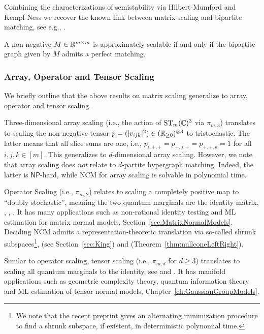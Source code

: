 Combining the characterizations of semistability via Hilbert-Mumford and Kempf-Ness we recover the known link between matrix scaling and bipartite matching, see e.g., \cite{rothblum1989scalings}.

\begin{theorem}
	A non-negative $M \in \mathbb R^{m \times m}$ is approximately scalable if and only if the bipartite graph given by $M$ admits a perfect matching.
\end{theorem}


\subsubsection*{Array, Operator and Tensor Scaling}

We briefly outline that the above results on matrix scaling generalize to array, operator and tensor scaling.

Three-dimensional array scaling (i.e., the action of $\operatorname{ST}_m(\mathbb C)^3$ via $\pi_{m,3}$) translates to scaling the non-negative tensor $p = (|v_{ijk}|^2) \in (\mathbb R_{\geq 0})^{\otimes 3}$ to tristochastic. The latter means that all slice sums are one, i.e., $p_{i,+,+} = p_{+,j,+} = p_{+,+,k} = 1$ for all $i,j,k \in [m]$. This generalizes to $d$-dimensional array scaling. However, we note that array scaling does \emph{not} relate to $d$-partite hypergraph matching. Indeed, the latter is $\mathsf{NP}$-hard, while NCM for array scaling is solvable in polynomial time.

Operator Scaling (i.e., $\pi_{m,2}$) relates to scaling a completely positive map to ``doubly stochastic'', meaning the two quantum marginals are the identity matrix, \cite{gurvits2004classical}, \cite{garg2016deterministic}, \cite[Section~2.2]{gargOliveira2018Survey}. It has many applications such as non-rational identity testing \cite{garg2016deterministic} and ML estimation for matrix normal models, Section~\ref{sec:MatrixNormalModels}. Deciding NCM admits a representation-theoretic translation via so-called shrunk subspaces\footnote{We note that the recent preprint \cite{franks2022shrunk} gives an alternating minimization procedure to find a shrunk subspace, if existent, in deterministic polynomial time.}, \cite{King} (see Section~\ref{sec:King}) and \cite{BurginDraisma} (Theorem~\ref{thm:nullconeLeftRight}).

Similar to operator scaling, tensor scaling (i.e., $\pi_{m,d}$ for $d \geq 3$) translates to scaling all quantum marginals to the identity, see \cite{burgisser2017alternating} and \cite[Section~2.3]{gargOliveira2018Survey}. It has manifold applications such as geometric complexity theory, quantum information theory and ML estimation of tensor normal models, Chapter~\ref{ch:GaussianGroupModels}.




